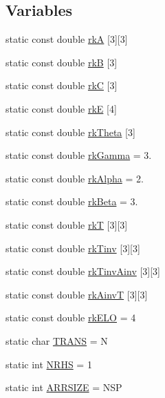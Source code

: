 \subsection*{Variables}
\begin{DoxyCompactItemize}
\item 
static const double \hyperlink{namespaceradau2a_a37314d1d93d3f053f469c40c5d42a43e}{rkA} \mbox{[}3\mbox{]}\mbox{[}3\mbox{]}
\item 
static const double \hyperlink{namespaceradau2a_aefb80779066572ac8b1e549cf1293de1}{rkB} \mbox{[}3\mbox{]}
\item 
static const double \hyperlink{namespaceradau2a_a7e8fecc1a981ceff1796a595b0ef5b4a}{rkC} \mbox{[}3\mbox{]}
\item 
static const double \hyperlink{namespaceradau2a_ae792ec3177ed6d29903669bcde591f94}{rkE} \mbox{[}4\mbox{]}
\item 
static const double \hyperlink{namespaceradau2a_a905a164e07054850af60562b36b1aa9f}{rk\+Theta} \mbox{[}3\mbox{]}
\item 
static const double \hyperlink{namespaceradau2a_a188fa0b309eb2826403d911684735824}{rk\+Gamma} = 3.
\item 
static const double \hyperlink{namespaceradau2a_ab60c47377f4985db23effa46e2239c24}{rk\+Alpha} = 2.
\item 
static const double \hyperlink{namespaceradau2a_a9a1ddba0cd8b29630b2c005af061c656}{rk\+Beta} = 3.
\item 
static const double \hyperlink{namespaceradau2a_ac217dadb5a83f73958dba436ae4fa415}{rkT} \mbox{[}3\mbox{]}\mbox{[}3\mbox{]}
\item 
static const double \hyperlink{namespaceradau2a_a967c2bc749d9b8cda1585bf4ee50b1c1}{rk\+Tinv} \mbox{[}3\mbox{]}\mbox{[}3\mbox{]}
\item 
static const double \hyperlink{namespaceradau2a_a048232e984719eb1fed3f8ba7fb4c25b}{rk\+Tinv\+Ainv} \mbox{[}3\mbox{]}\mbox{[}3\mbox{]}
\item 
static const double \hyperlink{namespaceradau2a_af7c73eb3be684541be92d125fef651bc}{rk\+AinvT} \mbox{[}3\mbox{]}\mbox{[}3\mbox{]}
\item 
static const double \hyperlink{namespaceradau2a_a8f0bf108626219e500ffe0b78c01b246}{rk\+E\+LO} = 4
\item 
static char \hyperlink{namespaceradau2a_ac3a739e01fca1200932ac123dc0bf0fa}{T\+R\+A\+NS} = \textquotesingle{}N\textquotesingle{}
\item 
static int \hyperlink{namespaceradau2a_a67ae7402ff0a6a919cfc653405f513e0}{N\+R\+HS} = 1
\item 
static int \hyperlink{namespaceradau2a_ad00dd88322d09c410e8e5b9af87af14c}{A\+R\+R\+S\+I\+ZE} = N\+SP
\end{DoxyCompactItemize}


